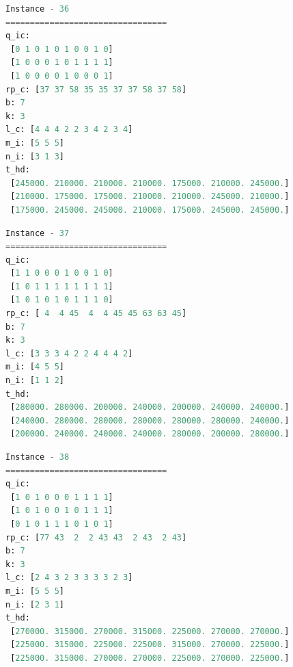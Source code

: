 \documentclass[11pt]{article}
\begin{document}
\begin{lstlisting}[language=Python]
Instance - 36
=================================
q_ic:
 [0 1 0 1 0 1 0 0 1 0]
 [1 0 0 0 1 0 1 1 1 1]
 [1 0 0 0 0 1 0 0 0 1]
rp_c: [37 37 58 35 35 37 37 58 37 58]
b: 7
k: 3
l_c: [4 4 4 2 2 3 4 2 3 4]
m_i: [5 5 5]
n_i: [3 1 3]
t_hd:
 [245000. 210000. 210000. 210000. 175000. 210000. 245000.]
 [210000. 175000. 175000. 210000. 210000. 245000. 210000.]
 [175000. 245000. 245000. 210000. 175000. 245000. 245000.]
\end{lstlisting}
\begin{lstlisting}[language=Python]
Instance - 37
=================================
q_ic:
 [1 1 0 0 0 1 0 0 1 0]
 [1 0 1 1 1 1 1 1 1 1]
 [1 0 1 0 1 0 1 1 1 0]
rp_c: [ 4  4 45  4  4 45 45 63 63 45]
b: 7
k: 3
l_c: [3 3 3 4 2 2 4 4 4 2]
m_i: [4 5 5]
n_i: [1 1 2]
t_hd:
 [280000. 280000. 200000. 240000. 200000. 240000. 240000.]
 [240000. 280000. 280000. 280000. 280000. 280000. 240000.]
 [200000. 240000. 240000. 240000. 280000. 200000. 280000.]
\end{lstlisting}
\begin{lstlisting}[language=Python]
Instance - 38
=================================
q_ic:
 [1 0 1 0 0 0 1 1 1 1]
 [1 0 1 0 0 1 0 1 1 1]
 [0 1 0 1 1 1 0 1 0 1]
rp_c: [77 43  2  2 43 43  2 43  2 43]
b: 7
k: 3
l_c: [2 4 3 2 3 3 3 3 2 3]
m_i: [5 5 5]
n_i: [2 3 1]
t_hd:
 [270000. 315000. 270000. 315000. 225000. 270000. 270000.]
 [225000. 315000. 225000. 225000. 315000. 270000. 225000.]
 [225000. 315000. 270000. 270000. 225000. 270000. 225000.]
\end{lstlisting}





\end{document}
